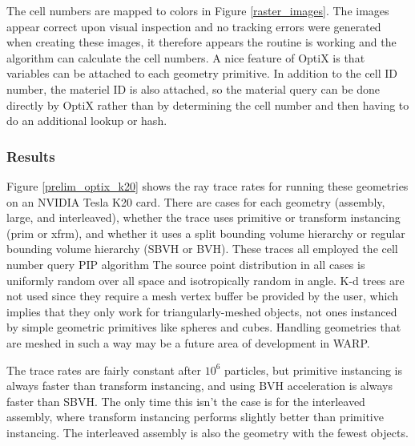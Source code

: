 The cell numbers are mapped to colors in Figure \ref{raster_images}. The images appear correct upon visual inspection and no tracking errors were generated when creating these images, it therefore appears the routine is working and the algorithm can calculate the cell numbers.  A nice feature of OptiX is that variables can be attached to each geometry primitive.  In addition to the cell ID number, the materiel ID is also attached, so the material query can be done directly by OptiX rather than by determining the cell number and then having to do an additional lookup or hash.

\subsubsection{Results}

Figure \ref{prelim_optix_k20} shows the ray trace rates for running these geometries on an NVIDIA Tesla K20 card.  There are cases for each geometry (assembly, large, and interleaved), whether the trace uses primitive or transform instancing (prim or xfrm), and whether it uses a split bounding volume hierarchy or regular bounding volume hierarchy (SBVH or BVH).  These traces all employed the cell number query PIP algorithm%
The source point distribution in all cases is uniformly random over all space and isotropically random in angle.  %
K-d trees are not used since they require a mesh vertex buffer be provided by the user, which implies that they only work for triangularly-meshed objects, not ones instanced by simple geometric primitives like spheres and cubes.  Handling geometries that are meshed in such a way may be a future area of development in WARP.%

The trace rates are fairly constant after $10^6$ particles, but primitive instancing is always faster than transform instancing,%
 and using BVH acceleration is always faster than SBVH.  The only time this isn't the case is for the interleaved assembly, where transform instancing performs slightly better than primitive instancing.  The interleaved assembly is also the geometry with the fewest objects.  

